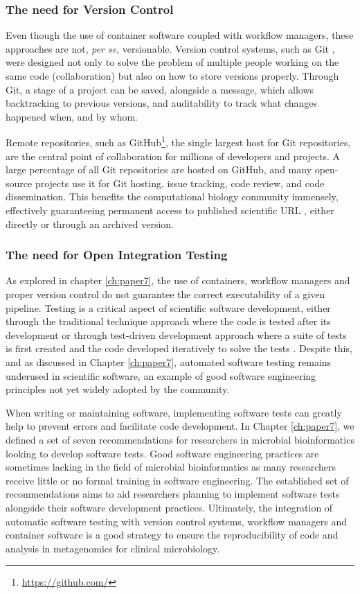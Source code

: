 \subsubsection{The need for Version Control}

Even though the use of container software coupled with workflow managers, these approaches are not, \textit{per se}, versionable. Version control systems, such as Git \citep{chacon2014pro}, were designed not only to solve the problem of multiple people working on the same code (collaboration) but also on how to store versions properly. Through Git, a stage of a project can be saved, alongside a message, which allows backtracking to previous versions, and auditability to track what changes happened when, and by whom. 

Remote repositories, such as GitHub\footnote{\url{https://github.com/}}, the single largest host for Git repositories, are the central point of collaboration for millions of developers and projects. A large percentage of all Git repositories are hosted on GitHub, and many open-source projects use it for Git hosting, issue tracking, code review, and code dissemination. This benefits the computational biology community immensely, effectively guaranteeing permanent access to published scientific \ac{URL} \citep{mangul_challenges_2019}, either directly or through an archived version.  

\subsubsection{The need for Open Integration Testing} \label{sssection:integration_testing}

As explored in chapter \ref{ch:paper7}, the use of containers, workflow managers and proper version control do not guarantee the correct executability of a given pipeline. Testing is a critical aspect of scientific software development, either through the traditional technique approach where the code is tested after its development or through test-driven development approach where a suite of tests is first created and the code developed iteratively to solve the tests \citep{krafczyk_scientific_2019}. Despite this, and as discussed in Chapter \ref{ch:paper7}, automated software testing remains underused in scientific software, an example of good software engineering principles not yet widely adopted by the community. 

When writing or maintaining software, implementing software tests can greatly help to prevent errors and facilitate code development. In Chapter \ref{ch:paper7}, we defined a set of seven recommendations for researchers in microbial bioinformatics looking to develop software tests. Good software engineering practices are sometimes lacking in the field of microbial bioinformatics as many researchers receive little or no formal training in software engineering. The established set of recommendations aims to aid researchers planning to implement software tests alongside their software development practices. Ultimately, the integration of automatic software testing with version control systems, workflow managers and container software is a good strategy to ensure the reproducibility of code and analysis in metagenomics for clinical microbiology. 


